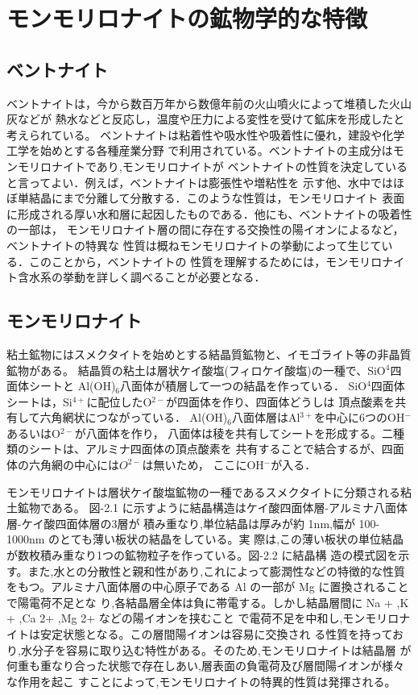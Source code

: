 \section{モンモリロナイトの鉱物学的な特徴}
\subsection{ベントナイト}
ベントナイトは，今から数百万年から数億年前の火山噴火によって堆積した火山灰などが
熱水などと反応し，温度や圧力による変性を受けて鉱床を形成したと考えられている。
ベントナイトは粘着性や吸水性や吸着性に優れ，建設や化学工学を始めとする各種産業分野
で利用されている。ベントナイトの主成分はモンモリロナイトであり,モンモリロナイトが
ベントナイトの性質を決定していると言ってよい．例えば，ベントナイトは膨張性や増粘性を
示す他、水中ではほぼ単結晶にまで分離して分散する．このような性質は，モンモリロナイト
表面に形成される厚い水和層に起因したものである．他にも、ベントナイトの吸着性の一部は，
モンモリロナイト層の間に存在する交換性の陽イオンによるなど，ベントナイトの特異な
性質は概ねモンモリロナイトの挙動によって生じている．このことから，ベントナイトの
性質を理解するためには，モンモリロナイト含水系の挙動を詳しく調べることが必要となる．
\subsection{モンモリロナイト}
粘土鉱物にはスメクタイトを始めとする結晶質鉱物と、イモゴライト等の非晶質鉱物がある。
結晶質の粘土は層状ケイ酸塩(フィロケイ酸塩)の一種で、SiO$^4$四面体シートと
Al(OH)$_6$八面体が積層して一つの結晶を作っている．
SiO$^4$四面体シートは，Si$^{4+}$に配位したO$^{2-}$が四面体を作り、四面体どうしは
頂点酸素を共有して六角網状につながっている．
Al(OH)$_6$八面体層はAl$^{3+}$を中心に6つのOH$^-$あるいはO$^{2-}$が八面体を作り，
八面体は稜を共有してシートを形成する。二種類のシートは、アルミナ四面体の頂点酸素を
共有することで結合するが、四面体の六角網の中心には$O^{2-}$は無いため，
ここにOH$^-$が入る．

モンモリロナイトは層状ケイ酸塩鉱物の一種であるスメクタイトに分類される粘土鉱物である。
図-2.1 に示すように結晶構造はケイ酸四面体層-アルミナ八面体層-ケイ酸四面体層の3層が
積み重なり,単位結晶は厚みが約 1nm,幅が 100-1000nm のとても薄い板状の結晶をしている。実
際は,この薄い板状の単位結晶が数枚積み重なり1つの鉱物粒子を作っている。図-2.2 に結晶構
造の模式図を示す。また,水との分散性と親和性があり,これによって膨潤性などの特徴的な性質
をもつ。アルミナ八面体層の中心原子である Al の一部が Mg に置換されることで陽電荷不足とな
り,各結晶層全体は負に帯電する。しかし結晶層間に Na + ,K + ,Ca 2+ ,Mg 2+ などの陽イオンを挟むこと
で電荷不足を中和し,モンモリロナイトは安定状態となる。この層間陽イオンは容易に交換され
る性質を持っており,水分子を容易に取り込む特性がある。そのため,モンモリロナイトは結晶層
が何重も重なり合った状態で存在しあい,層表面の負電荷及び層間陽イオンが様々な作用を起こ
すことによって,モンモリロナイトの特異的性質は発揮される。



